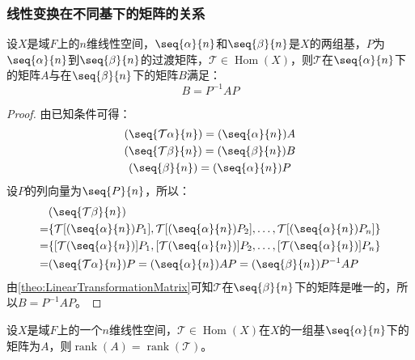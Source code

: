 \subsubsection{线性变换在不同基下的矩阵的关系}
\begin{theorem}
	设$X$是域$F$上的$n$维线性空间，$\seq{\alpha}{n}$和$\seq{\beta}{n}$是$X$的两组基，$P$为$\seq{\alpha}{n}$到$\seq{\beta}{n}$的过渡矩阵，$\mathcal{T}\in\operatorname{Hom}(X)$，则$\mathcal{T}$在$\seq{\alpha}{n}$下的矩阵$A$与在$\seq{\beta}{n}$下的矩阵$B$满足：
	\begin{equation*}
		B=P^{-1}AP
	\end{equation*}
\end{theorem}
\begin{proof}
	由已知条件可得：
	\begin{gather*}
		(\seq{\mathcal{T}\alpha}{n})=(\seq{\alpha}{n})A \\
		(\seq{\mathcal{T}\beta}{n})=(\seq{\beta}{n})B \\
		(\seq{\beta}{n})=(\seq{\alpha}{n})P
	\end{gather*}
	设$P$的列向量为$\seq{P}{n}$，所以：
	\begin{align*}
		&(\seq{\mathcal{T}\beta}{n}) \\
		=&\{\mathcal{T}[(\seq{\alpha}{n})P_1],\mathcal{T}[(\seq{\alpha}{n})P_2],\dots,\mathcal{T}[(\seq{\alpha}{n})P_n]\} \\
		=&\{[\mathcal{T}(\seq{\alpha}{n})]P_1,[\mathcal{T}(\seq{\alpha}{n})]P_2,\dots,[\mathcal{T}(\seq{\alpha}{n})]P_n\} \\
		=&(\seq{\mathcal{T}\alpha}{n})P 
		=(\seq{\alpha}{n})AP
		=(\seq{\beta}{n})P^{-1}AP
	\end{align*}
	由\cref{theo:LinearTransformationMatrix}可知$\mathcal{T}$在$\seq{\beta}{n}$下的矩阵是唯一的，所以$B=P^{-1}AP$。
\end{proof}
\begin{theorem}
	设$X$是域$F$上的一个$n$维线性空间，$\mathcal{T}\in\operatorname{Hom}(X)$在$X$的一组基$\seq{\alpha}{n}$下的矩阵为$A$，则$\operatorname{rank}(A)=\operatorname{rank}(\mathcal{T})$。
\end{theorem}
